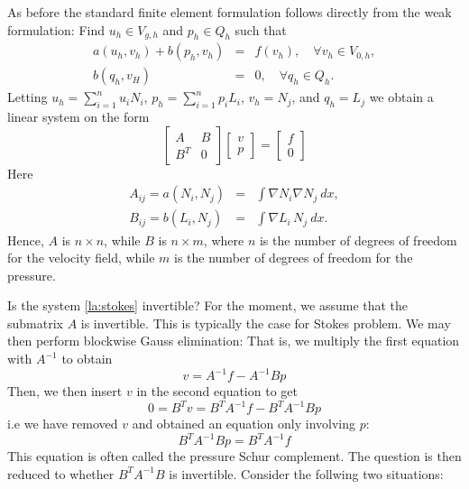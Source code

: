 \documentclass[a4paper,11pt]{amsart}
\begin{document}
As before the standard finite element formulation follows directly from the weak formulation:
Find $u_h\in V_{g,h}$ and $p_h\in Q_h$ such that
\begin{eqnarray}
\label{eq:stdGalerkin1}
a(u_h, v_h ) + b(p_h, v_h) &=& f(v_h),\quad \forall v_h\in V_{0,h}, \\
\label{eq:stdGalerkin2}
b(q_h, v_H) &=& 0,\quad \forall q_h \in Q_h .
\end{eqnarray}
Letting $u_h=\sum_{i=1}^n u_i N_i$, $p_h=\sum_{i=1}^n p_i L_i$, $v_h=N_j$, and $q_h=L_j$
we obtain a linear system on the form
\begin{equation}
\left[ %
	\begin{array}{cc}
	A & B\\
	B^T & 0
	\end{array}
\right]
\left[ %
	\begin{array}{c}
	v\\
	p
	\end{array}
\right]
=
\left[ %
	\begin{array}{c}
	f\\
	0
	\end{array}
\right]
\label{la:stokes}
\end{equation}
Here
\begin{eqnarray}
A_{ij} = a(N_i,N_j) &=& \int\nabla N_i \nabla N_j \ dx, \\
B_{ij} = b(L_i,N_j) &=& \int\nabla L_i \, N_j \ dx.
\end{eqnarray}
Hence, $A$ is $n\times n$, while $B$ is $n\times m$,
where $n$ is the number of degrees of freedom for the velocity field, while
$m$ is the number of degrees of freedom for the pressure.

Is the system \eqref{la:stokes} invertible?  For the moment, we assume that the submatrix $A$ is invertible. This is typically the case for
Stokes problem. We may then perform blockwise Gauss elimination:
That is,
we multiply the first equation with $A^{-1}$ to obtain
\[v = A^{-1}f - A^{-1}Bp\]
Then, we then insert $v$ in the second equation to get
\[0 = B^Tv = B^TA^{-1}f - B^TA^{-1}Bp\]
i.e we have removed $v$ and obtained an equation only involving $p$:
\[B^TA^{-1}Bp = B^TA^{-1}f\]
This equation is often called the pressure Schur complement. The question is then reduced to whether $B^TA^{-1}B$ is invertible.
Consider the follwing two situations:
\end{document}
